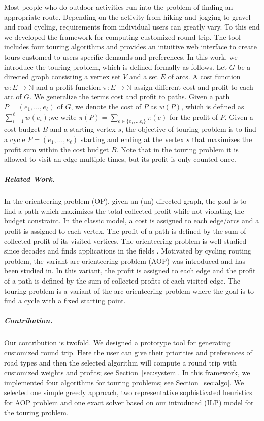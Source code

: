 \documentclass[sigconf,natbib=false]{acmart}
\begin{document}
Most people who do outdoor activities run into the problem of finding an appropriate route. 
Depending on the activity from hiking and jogging to gravel and road cycling, requirements from individual users can greatly vary.
To this end we developed the framework \tG for computing customized round trip. 
The tool \tG includes four touring algorithms and provides an intuitive web interface to create tours customed to users specific demands and preferences. 
In this work, we introduce the touring problem, which is defined formally as follows. 
Let $G$ be a directed graph consisting a vertex set $V$ and a set $E$ of arcs. A cost function $w:E \rightarrow \mathbb{N}$ and a profit function $\pi: E \rightarrow \mathbb{N}$ assign different cost and profit to each arc of $G$.
We generalize the terms cost and profit to paths. Given a path $P = (e_1, \dots, e_{\ell})$ of $G$, we denote the cost of $P$ as $w(P)$, which is defined as $\sum_{i=1}^{\ell} w(e_i)$;we write $\pi(P) = \sum_{ e \in {\{e_1, \ldots e_l\}} } \pi(e)$ for the profit of $P$.  
Given a cost budget $B$ and a starting vertex $s$, the objective of touring problem is to find a cycle $P=(e_1, \dots, e_{\ell})$ starting and ending at the vertex $s$ that maximizes the profit sum within the cost budget $B$. 
Note that in the touring problem it is allowed to visit an edge multiple times, but its profit is only counted once. 
\subparagraph*{\textbf{Related Work.}}
In the orienteering problem (OP), given an (un)-directed graph, the goal is to find a path which maximizes the total collected profit while not violating the budget constraint. In the classic model, a cost is assigned to each edge/arcs and a profit is assigned to each vertex. The profit of a path is defined by the sum of collected profit of its visited vertices. 
The orienteering problem is well-studied since decades and finds applications in the fields . 
Motivated by cycling routing problem, the variant arc orienteering problem (AOP) was introduced and has been studied in. In this variant, the profit is assigned to each edge and the profit of a path is defined by the sum of collected profits of each visited edge.
The touring problem is a variant of the  arc orienteering problem where the goal is to find a cycle with a fixed starting point. 


\subparagraph*{\textbf{Contribution.}}
Our contribution is twofold. We designed a prototype tool \tG for generating customized round trip. Here the user can give their priorities and preferences of road types and then the selected algorithm will compute a round trip with customized weights and profits; see Section~\ref{sec:system}. In this framework, we implemented four algorithms for touring problems; see Section~\ref{sec:algo}.
We selected one simple greedy approach, two representative sophisticated heuristics for AOP problem and one exact solver based on our introduced (ILP) model for the touring problem.
\end{document}
